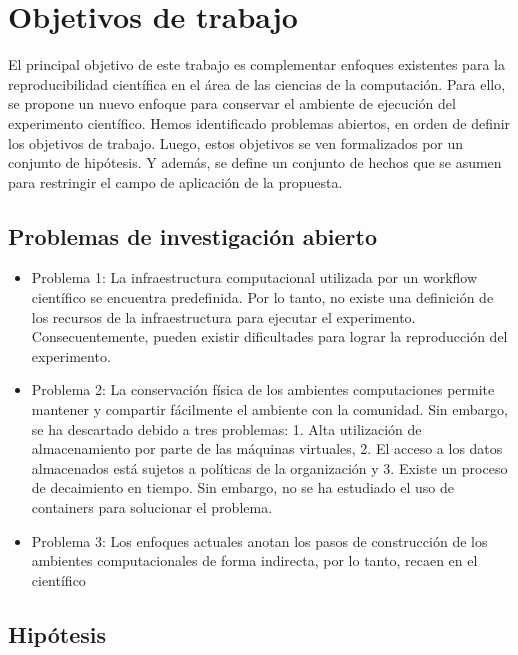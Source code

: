 \chapter{Objetivos de trabajo}\label{Chapter3} 
El principal objetivo de este trabajo es complementar enfoques existentes para la reproducibilidad científica en el área de las ciencias de la computación. Para ello, se propone un nuevo enfoque para conservar el ambiente de ejecución del experimento científico.
Hemos identificado problemas abiertos, en orden de definir los objetivos de trabajo. Luego, estos objetivos se ven formalizados por un conjunto de hipótesis. Y además, se define un conjunto de hechos que se asumen para restringir el campo de aplicación de la propuesta.


\section{Problemas de investigación abierto}
\begin{itemize}
	\item Problema 1: La infraestructura computacional utilizada por un workflow científico se encuentra predefinida. Por lo tanto, no existe una definición de los recursos de la infraestructura para ejecutar el experimento. Consecuentemente, pueden existir dificultades para lograr la reproducción del experimento. 
	\item Problema 2: La conservación física de los ambientes computaciones permite mantener y compartir fácilmente el ambiente con la comunidad. Sin embargo, se ha descartado debido a tres problemas: 
		1. Alta utilización de almacenamiento por parte de las máquinas virtuales, 
		2. El acceso a los datos almacenados está sujetos a políticas de la organización 
		y 3. Existe un proceso de decaimiento en tiempo.
		Sin embargo, no se ha estudiado el uso de containers para solucionar el problema.
	\item Problema 3: Los enfoques actuales anotan los pasos de construcción de los ambientes computacionales de forma indirecta, por lo tanto, recaen en el científico 
\end{itemize}

\section{Hipótesis}

